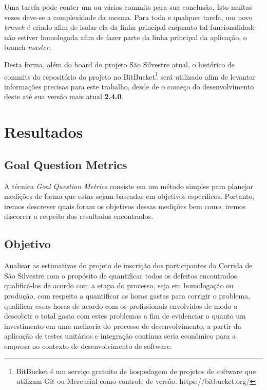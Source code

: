 \documentclass[11pt, a4paper]{article}
\begin{document}
Uma tarefa pode conter um ou vários commits para sua conclusão. Isto muitas vezes deve-se a complexidade da mesma. Para toda e qualquer tarefa, um novo \textit{branch} é criado afim de isolar ela da linha principal enquanto tal funcionalidade não estiver homologada afim de fazer parte da linha principal da aplicação, o branch \textit{master}.

Desta forma, além do board do projeto São Silvestre atual, o histórico de commits do repositório do projeto no BitBucket\footnote{BitBucket é um serviço gratuito de hospedagem de projetos de software que utilizam Git ou Mercurial como controle de versão. https://bitbucket.org/} será utilizado afim de levantar informações precisas para este trabalho, desde de o começo do desenvolvimento deste até sua versão mais atual \textbf{2.4.0}.

\section{Resultados}\label{sec:resultados}
\subsection{Goal Question Metrics}
A técnica \textit{Goal Question Metrics} consiste em um método simples para planejar medições de forma que estas sejam baseadas em objetivos específicos. Portanto, iremos descrever quais foram os objetivos dessas medições bem como, iremos discorrer a respeito dos resultados encontrados.

\subsection{Objetivo}
Analisar as estimativas do projeto de inscrição dos participantes da Corrida de São Silvestre com o propósito de quantificar todos os defeitos encontrados, qualificá-los de acordo com a etapa do processo, seja em homologação ou produção, com respeito a quantificar as horas gastas para corrigir o problema, qualificar essas horas de acordo com os profissionais envolvidos de modo a descobrir o total gasto com estes problemas a fim de evidenciar o quanto um investimento em uma melhoria do processo de desenvolvimento, a partir da aplicação de testes unitários e integração contínua seria econômico para a empresa no contexto de desenvolvimento de software.
\end{document}
